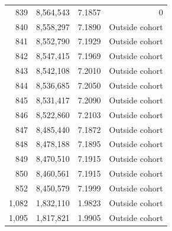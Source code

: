 \begin{tabular}{rrrr}
839 & 8,564,543 & 7.1857 & 0 \\
840 & 8,558,297 & 7.1890 & Outside cohort \\
841 & 8,552,790 & 7.1929 & Outside cohort \\
842 & 8,547,415 & 7.1969 & Outside cohort \\
843 & 8,542,108 & 7.2010 & Outside cohort \\
844 & 8,536,685 & 7.2050 & Outside cohort \\
845 & 8,531,417 & 7.2090 & Outside cohort \\
846 & 8,522,860 & 7.2103 & Outside cohort \\
847 & 8,485,440 & 7.1872 & Outside cohort \\
848 & 8,478,188 & 7.1895 & Outside cohort \\
849 & 8,470,510 & 7.1915 & Outside cohort \\
850 & 8,460,561 & 7.1915 & Outside cohort \\
852 & 8,450,579 & 7.1999 & Outside cohort \\
1,082 & 1,832,110 & 1.9823 & Outside cohort \\
1,095 & 1,817,821 & 1.9905 & Outside cohort \\
\bottomrule
\end{tabular}
